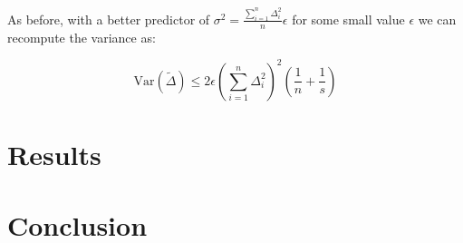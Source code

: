 \documentclass[11pt]{article}
\begin{document}
As before, with a better predictor of $\sigma^2 = \frac{\sum_{i = 1}^{n}\Delta_i^2}{n} \epsilon$ for some small value $\epsilon$ we can recompute the variance as:

\[
\mathrm{Var}(\tilde{\Delta}) \leq 2\epsilon(\sum_{i = 1}^{n}\Delta_i^2)^2(\frac{1}{n} + \frac{1}{s})
\]

\newpage

\section{Results}

\newpage

\section{Conclusion}

\newpage



\end{document}

